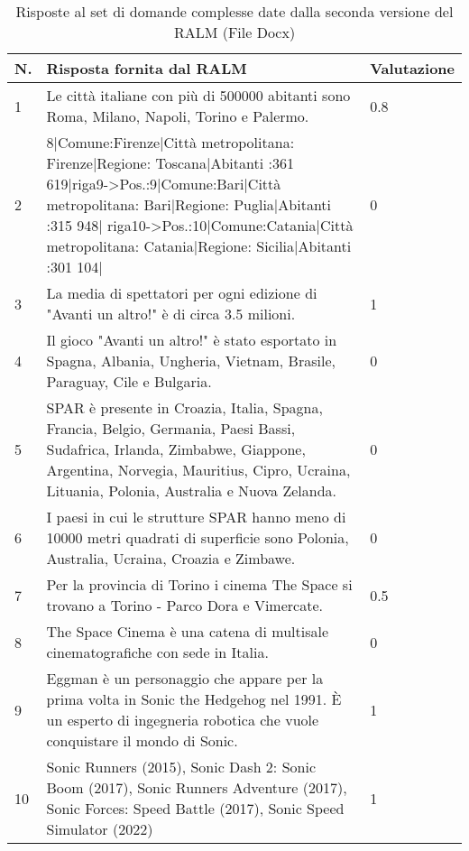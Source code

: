 \begin{table}[H]
    \centering
    \begin{tabular}{|p{0.5cm} |p{6cm} |p{2cm}|}
        \hline
        \textbf{N}. & \textbf{Risposta fornita dal RALM} & \textbf{Valutazione} \\
        \hline
        1 & Le città italiane con più di 500000 abitanti sono Roma, Milano, Napoli, Torino e Palermo. & 0.8 \\
        \hline
        2 & 8|Comune:Firenze|Città metropolitana: Firenze|Regione: Toscana|Abitanti :361 619|riga9->Pos.:9|Comune:Bari|Città metropolitana: Bari|Regione: Puglia|Abitanti :315 948| riga10->Pos.:10|Comune:Catania|Città metropolitana: Catania|Regione: Sicilia|Abitanti :301 104| & 0 \\
        \hline
        3 & La media di spettatori per ogni edizione di "Avanti un altro!" è di circa 3.5 milioni. & 1 \\
        \hline
        4 & Il gioco "Avanti un altro!" è stato esportato in Spagna, Albania, Ungheria, Vietnam, Brasile, Paraguay, Cile e Bulgaria. & 0 \\
        \hline
        5 & SPAR è presente in Croazia, Italia, Spagna, Francia, Belgio, Germania, Paesi Bassi, Sudafrica, Irlanda, Zimbabwe, Giappone, Argentina, Norvegia, Mauritius, Cipro, Ucraina, Lituania, Polonia, Australia e Nuova Zelanda. & 0 \\
        \hline
        6 & I paesi in cui le strutture SPAR hanno meno di 10000 metri quadrati di superficie sono Polonia, Australia, Ucraina, Croazia e Zimbawe. & 0 \\
        \hline
        7 & Per la provincia di Torino i cinema The Space si trovano a Torino - Parco Dora e Vimercate. & 0.5 \\
        \hline
        8 & The Space Cinema è una catena di multisale cinematografiche con sede in Italia. & 0 \\
        \hline
        9 & Eggman è un personaggio che appare per la prima volta in Sonic the Hedgehog nel 1991. È un esperto di ingegneria robotica che vuole conquistare il mondo di Sonic. & 1 \\
        \hline
        10 & Sonic Runners (2015), Sonic Dash 2: Sonic Boom (2017), Sonic Runners Adventure (2017), Sonic Forces: Speed Battle (2017), Sonic Speed Simulator (2022) & 1 \\
        \hline
    \end{tabular}
    \caption{Risposte al set di domande complesse date dalla seconda versione del RALM (File Docx)}
\end{table}

